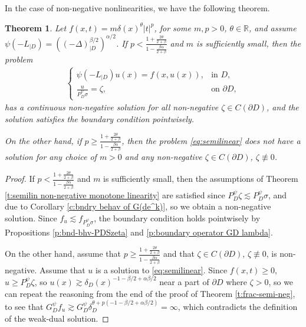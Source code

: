 \documentclass[12pt,a4paper,onecolumn]{article}
\newtheorem{thm}{Theorem}[section]
\theoremstyle{definition}
\newcommand{\R}{\mathbb{R}}
\newcommand{\1}{\mathbf 1}
\newcommand{\de}{\delta_D}
\newcommand{\Lo}{\psi(-L_{|D})}
\newcommand{\INTFR}{\left((-\Delta)^{\beta/2}_{|D}\right)^{\alpha/2}}
\newcommand{\GDP}{G_D^\psi}
\newcommand{\PDS}{P^{\psi}_{ D}}
\numberwithin{equation}{section}
\begin{document}
		In the case of non-negative nonlinearities, we have the following theorem.
	\begin{thm}\label{t:frac-semi-pos}
		Let $f(x,t)=m\delta(x)^\theta|t|^p$, for some $m,p>0$, $\theta\in \R$, and assume $\Lo=\INTFR$. If $p<\frac{1+\frac{2\theta}{2+\beta}}{1-\frac{\beta\alpha}{2+\beta}}$ and $m$ is sufficiently small, then the problem
		\begin{align*}
			\begin{cases}
				\Lo u(x)=f(x,u(x)),&\textrm{in $D$},\\
				\frac{u}{\PDS\sigma}=\zeta,&\textrm{on $\partial D$},
			\end{cases}
		\end{align*}
		has a continuous non-negative solution for all non-negative $\zeta\in C(\partial D)$, and the solution satisfies the boundary condition pointwisely.
		
		On the other hand, if $p\ge\frac{1+\frac{2\theta}{2+\beta}}{1-\frac{\beta\alpha}{2+\beta}}$, then the problem \eqref{eq:semilinear} does not have a solution for any choice of $m>0$ and any non-negative  $\zeta\in C(\partial D)$, $\zeta\not\equiv 0$.
	\end{thm}
	\begin{proof}
		If $p<\frac{1+\frac{2\theta}{2+\beta}}{1-\frac{\beta\alpha}{2+\beta}}$ and $m$ is sufficiently small, then the assumptions of Theorem \ref{t:semilin non-negative monotone linearity} are satisfied since $\PDS \zeta \lesssim \PDS\sigma$, and due to Corollary \ref{c:bndry behav of G(de^k)}, so we obtain a non-negative solution. Since $f_u\lesssim f_{\PDS\sigma}$, the boundary condition holds pointwisely by Propositions \ref{p:bnd-bhv-PDSzeta} and \ref{p:boundary operator GD lambda}.
		
		On the other hand, assume that $p\ge\frac{1+\frac{2\theta}{2+\beta}}{1-\frac{\beta\alpha}{2+\beta}}$ and that $\zeta\in C(\partial D)$, $\zeta\not\equiv 0$, is non-negative. Assume that $u$ is a solution to \ref{eq:semilinear}. Since $f(x,t)\ge 0$, $u\ge \PDS\zeta$, so  $u(x)\gtrsim \de(x)^{-1-\beta/2+\alpha\beta/2}$ near a part of $\partial D$ where $\zeta>0$, so we can repeat the reasoning from the end of the proof of Theorem \ref{t:frac-semi-neg}, to see that $\GDP f_u \gtrsim \GDP \de^{\theta+p(-1-\beta/2+\alpha\beta/2)}=\infty$, which contradicts the definition of the weak-dual solution.
	\end{proof}
    
\end{document}
